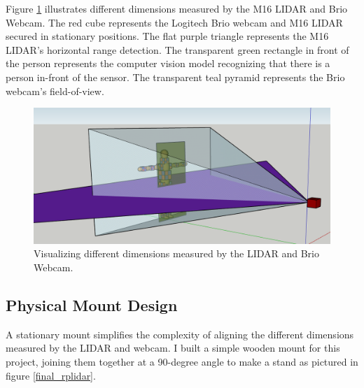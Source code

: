 \documentclass[onecolumn, draftclsnofoot,10pt, compsoc]{IEEEtran}
\makeatletter
\newcommand\captionof[1]{\def\@captype{#1}\caption}
\makeatother
\begin{document}
\begin{singlespace}
		Figure \ref{dimensions} illustrates different dimensions measured by the M16 LIDAR and Brio Webcam.
		The red cube represents the Logitech Brio webcam and M16 LIDAR secured in stationary positions.
		The flat purple triangle represents the M16 LIDAR's horizontal range detection.
		The transparent green rectangle in front of the person represents the computer vision model recognizing that there is a person in-front of the sensor.
		The transparent teal pyramid represents the Brio webcam's field-of-view.
		
		\begin{figure}[H]
			\includegraphics[scale=0.5]{different_dimensions.PNG}
			\captionof{figure}{Visualizing different dimensions measured by the LIDAR and Brio Webcam.}
			\label{dimensions}
		\end{figure}

		\subsection{Physical Mount Design}

		A stationary mount simplifies the complexity of aligning the different dimensions measured by the LIDAR and webcam. 
		I built a simple wooden mount for this project, joining them together at a 90-degree angle to make a stand as pictured in figure \ref{final_rplidar}.
		

\end{singlespace}
\end{document}
